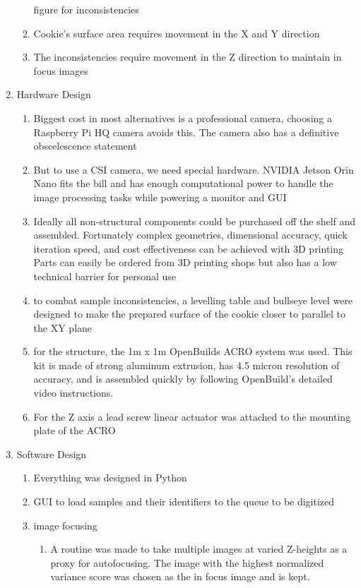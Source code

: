 \documentclass{article}
\begin{document}
\begin{outline}[enumerate]
\begin{enumerate}
\begin{enumerate}
				\subitem figure for inconsistencies
			\item Cookie's surface area requires movement in the X and Y direction
			\item The inconsistencies require movement in the Z direction to maintain in focus images
			\end{enumerate}
		\item Hardware Design
			\begin{enumerate}
			\item Biggest cost in most alternatives is a professional camera, choosing a Raspberry Pi HQ camera avoids this. The camera also has a definitive obscelescence statement %
			\item But to use a CSI camera, we need special hardware. NVIDIA Jetson Orin Nano fits the bill and has enough computational power to handle the image processing tasks while powering a monitor and GUI %
			\item Ideally all non-structural components could be purchased off the shelf and assembled. Fortunately complex geometries, dimensional accuracy, quick iteration speed, and cost effectiveness can be achieved with 3D printing  %
				\subitem Parts can easily be ordered from 3D printing shops but also has a low technical barrier for personal use
			\item to combat sample inconsistencies, a levelling table and bullseye level were designed to make the prepared surface of the cookie closer to parallel to the XY plane
			\item for the structure, the 1m x 1m OpenBuilds ACRO system was used. This kit is made of strong aluminum extrusion, has 4.5 micron resolution of accuracy, and is assembled quickly by following OpenBuild's detailed video instructions. %
			\item For the Z axis a lead screw linear actuator was attached to the mounting plate of the ACRO
			\end{enumerate}
		\item Software Design
			\begin{enumerate}
			\item Everything was designed in Python 
			\item GUI to load samples and their identifiers to the queue to be digitized
			\item image focusing
				\begin{enumerate}
				\item A routine was made to take multiple images at varied Z-heights as a proxy for autofocusing. The image with the highest normalized variance score was chosen as the in focus image and is kept. %

\end{enumerate}
\end{enumerate}
\end{enumerate}
\end{outline}
\end{document}
